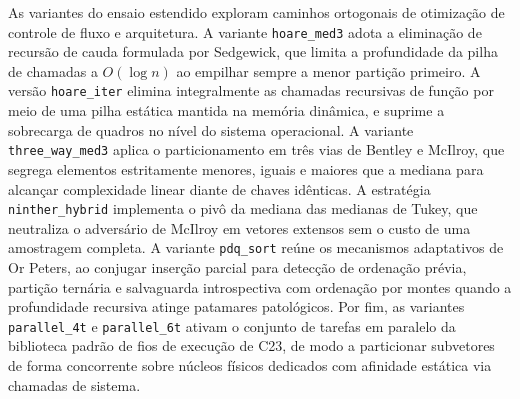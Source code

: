 \documentclass[12pt]{article}
\begin{document}
As variantes do ensaio estendido exploram caminhos ortogonais de otimização de controle de fluxo e arquitetura. A variante \texttt{hoare\_med3} adota a eliminação de recursão de cauda formulada por Sedgewick, que limita a profundidade da pilha de chamadas a $O(\log n)$ ao empilhar sempre a menor partição primeiro. A versão \texttt{hoare\_iter} elimina integralmente as chamadas recursivas de função por meio de uma pilha estática mantida na memória dinâmica, e suprime a sobrecarga de quadros no nível do sistema operacional. A variante \texttt{three\_way\_med3} aplica o particionamento em três vias de Bentley e McIlroy, que segrega elementos estritamente menores, iguais e maiores que a mediana para alcançar complexidade linear diante de chaves idênticas. A estratégia \texttt{ninther\_hybrid} implementa o pivô da mediana das medianas de Tukey, que neutraliza o adversário de McIlroy em vetores extensos sem o custo de uma amostragem completa. A variante \texttt{pdq\_sort} reúne os mecanismos adaptativos de Or Peters, ao conjugar inserção parcial para detecção de ordenação prévia, partição ternária e salvaguarda introspectiva com ordenação por montes quando a profundidade recursiva atinge patamares patológicos. Por fim, as variantes \texttt{parallel\_4t} e \texttt{parallel\_6t} ativam o conjunto de tarefas em paralelo da biblioteca padrão de fios de execução de C23, de modo a particionar subvetores de forma concorrente sobre núcleos físicos dedicados com afinidade estática via chamadas de sistema.
\end{document}
